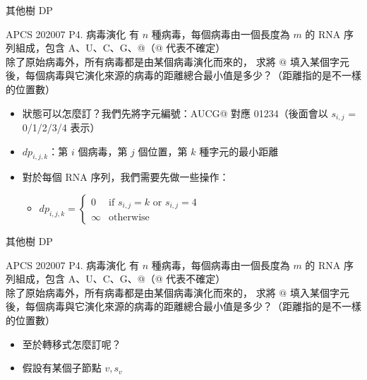 \documentclass[aspectratio=169]{beamer}
\begin{document}
    \begin{frame}{其他樹 DP}
        \begin{block}{APCS 202007 P4. 病毒演化}
            有 $n$ 種病毒，每個病毒由一個長度為 $m$ 的 RNA 序列組成，包含 A、U、C、G、@（@ 代表不確定）\\
            除了原始病毒外，所有病毒都是由某個病毒演化而來的，
            求將 $@$ 填入某個字元後，每個病毒與它演化來源的病毒的距離總合最小值是多少？（距離指的是不一樣的位置數）
        \end{block}

        \begin{itemize}
            \item<1-> 狀態可以怎麼訂？我們先將字元編號：AUCG@ 對應 01234（後面會以 $s_{i, j}$ = 0/1/2/3/4 表示）
            \item<2-> $dp_{i, j, k}$：第 $i$ 個病毒，第 $j$ 個位置，第 $k$ 種字元的最小距離
            \item<3-> 對於每個 RNA 序列，我們需要先做一些操作：
            \begin{itemize}
                \item<4-> $dp_{i, j, k} = \begin{cases}
                    0 & \text{if } s_{i, j} = k \text{ or } s_{i, j} = 4 \\
                    \infty & \text{otherwise}
                \end{cases}$
            \end{itemize}
        \end{itemize}
    \end{frame}

    \begin{frame}{其他樹 DP}
        \begin{block}{APCS 202007 P4. 病毒演化}
            有 $n$ 種病毒，每個病毒由一個長度為 $m$ 的 RNA 序列組成，包含 A、U、C、G、@（@ 代表不確定）\\
            除了原始病毒外，所有病毒都是由某個病毒演化而來的，
            求將 $@$ 填入某個字元後，每個病毒與它演化來源的病毒的距離總合最小值是多少？（距離指的是不一樣的位置數）
        \end{block}

        \begin{itemize}
            \item<1-> 至於轉移式怎麼訂呢？
            \item<2-> 假設有某個子節點 $v, s_{v}$
        \end{itemize}
    \end{frame}
\end{document}
